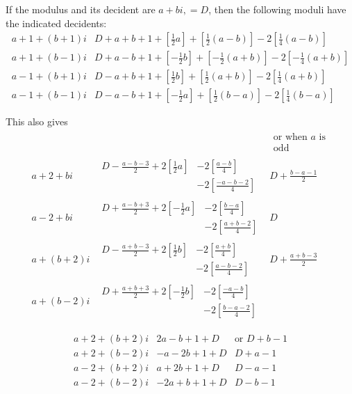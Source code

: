 If the modulus and its decident are $a+bi,=D$, then the following moduli have the indicated decidents:
{\small
\[
\begin{array}{l|l}
a+1+(b+1)i&D+a+b+1+[\tfrac12a]+[\tfrac12(a-b)]-2[\tfrac14(a-b)]\\
a+1+(b-1)i&D+a-b+1+[-\tfrac12b]+[-\tfrac12(a+b)]-2[-\tfrac14(a+b)]\\
a-1+(b+1)i&D-a+b+1+[\tfrac12b]+[\tfrac12(a+b)]-2[\tfrac14(a+b)]\\
a-1+(b-1)i&D-a-b+1+[-\tfrac12a]+[\tfrac12(b-a)]-2[\tfrac14(b-a)]
\end{array}
\]
}

This also gives
{\footnotesize
\[
\begin{array}{l|l|l}
&&\begin{gathered}\text{or when }a\text{ is}\\\text{odd}\end{gathered}\\
a+2+bi&\begin{aligned}D-\tfrac{a-b-3}2+2[\tfrac12a]&-2[\tfrac{a-b}4]\\&-2[\tfrac{-a-b-2}4]\end{aligned}&D+\tfrac{b-a-1}2\\[1ex]
a-2+bi&\begin{aligned}D+\tfrac{a-b+3}2+2[-\tfrac12a]&-2[\tfrac{b-a}4]\\&-2[\tfrac{a+b-2}4]\end{aligned}&D\\[1ex]
a+(b+2)i&\begin{aligned}D-\tfrac{a+b-3}2+2[\tfrac12b]&-2[\tfrac{a+b}4]\\&-2[\tfrac{a-b-2}4]\end{aligned}&D+\tfrac{a+b-3}2\\[1ex]
a+(b-2)i&\begin{aligned}D+\tfrac{a+b+3}2+2[-\tfrac12b]&-2[\tfrac{-a-b}4]\\&-2[\tfrac{b-a-2}4]\end{aligned}&
\end{array}
\]
}

\[
\begin{array}{l|rl}
a+2+(b+2)i&2a-b+1+D&\text{or }D+b-1\\
a+2+(b-2)i&-a-2b+1+D&D+a-1\\
a-2+(b+2)i&a+2b+1+D&D-a-1\\
a-2+(b-2)i&-2a+b+1+D&D-b-1
\end{array}
\]


